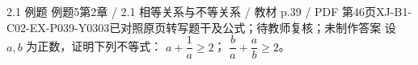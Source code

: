 \par\noindent\begin{minipage}{\linewidth}
\begin{bankitem}{2.1 例题 例题5}{第2章 / 2.1 相等关系与不等关系 / 教材 p.39 / PDF 第46页}{XJ-B1-C02-EX-P039-Y0303}{已对照原页转写题干及公式；待教师复核；未制作答案}
设 $a,b$ 为正数，证明下列不等式：
$a+\dfrac1a\ge2$；
$\dfrac ba+\dfrac ab\ge2$。
\end{bankitem}
\end{minipage}\par\medskip
